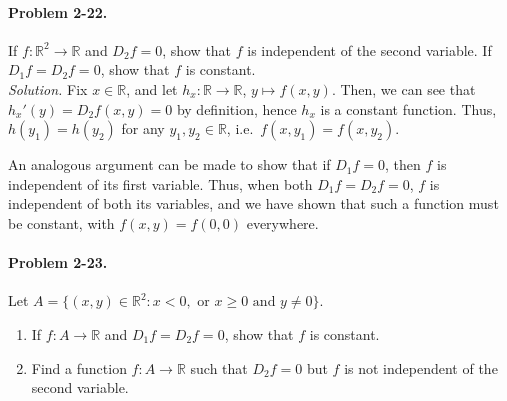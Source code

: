 \documentclass[11pt]{report}
\newcommand{\R}{\mathbb{R}}
\newcommand{\problem}[1]{\paragraph{Problem #1.}}
\newcommand{\solution}{\noindent\textit{Solution.} }
\begin{document}
    \problem{2-22} If $f\colon \R^2 \to \R$ and $D_2f = 0$, show that $f$ is
    independent of the second variable. If $D_1f = D_2f = 0$, show that $f$ is
    constant. \\

    \solution Fix $x \in \R$, and let $h_x\colon \R \to \R$, $y \mapsto f(x, y)$. Then,
    we can see that $h_x'(y) = D_2f(x, y) = 0$ by definition, hence $h_x$ is a
    constant function. Thus, $h(y_1) = h(y_2)$ for any $y_1, y_2 \in \R$, i.e.\ $f(x,
    y_1) = f(x, y_2)$.

    An analogous argument can be made to show that if $D_1f = 0$, then $f$ is
    independent of its first variable. Thus, when both $D_1f = D_2f = 0$, $f$ is
    independent of both its variables, and we have shown that such a function must be
    constant, with $f(x, y) = f(0, 0)$ everywhere.


    \problem{2-23} Let $A = \{(x, y) \in \R^2: x < 0, \text{ or }x \geq 0 \text{ and
    } y \neq 0\}$.
    \begin{enumerate}
        \item If $f\colon A \to \R$ and $D_1f = D_2f = 0$, show that $f$ is constant.
        \item Find a function $f\colon A \to \R$ such that $D_2f = 0$ but $f$ is not
        independent of the second variable.
    \end{enumerate}
\end{document}
